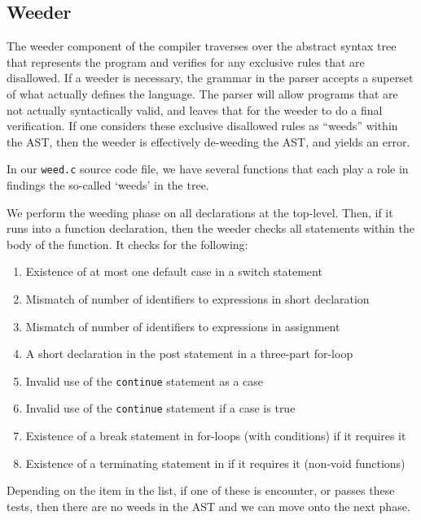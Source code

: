 \documentclass{article}
\begin{document}

\subsection{Weeder}

The weeder component of the compiler traverses over the abstract syntax tree that represents the program and verifies for any exclusive rules that are disallowed. If a weeder is necessary, the grammar in the parser accepts a superset of what actually defines the language. The parser will allow programs that are not actually syntactically valid, and leaves that for the weeder to do a final verification. If one considers these exclusive disallowed rules as ``weeds'' within the AST, then the weeder is effectively de-weeding the AST, and yields an error.

In our \texttt{weed.c} source code file, we have several functions that each play a role in findings the so-called `weeds' in the tree.

We perform the weeding phase on all declarations at the top-level. Then, if it runs into a function declaration, then the weeder checks all statements within the body of the function. It checks for the following:

\begin{enumerate}
    \item Existence of at most one default case in a switch statement
    \item Mismatch of number of identifiers to expressions in short declaration
    \item Mismatch of number of identifiers to expressions in assignment
    \item A short declaration in the post statement in a three-part for-loop
    \item Invalid use of the \texttt{continue} statement as a case
    \item Invalid use of the \texttt{continue} statement if a case is true
    \item Existence of a break statement in for-loops (with conditions) if it requires it
    \item Existence of a terminating statement in if it requires it (non-void functions)
\end{enumerate}

Depending on the item in the list, if one of these is encounter, or passes these tests, then there are no weeds in the AST and we can move onto the next phase.
\end{document}
